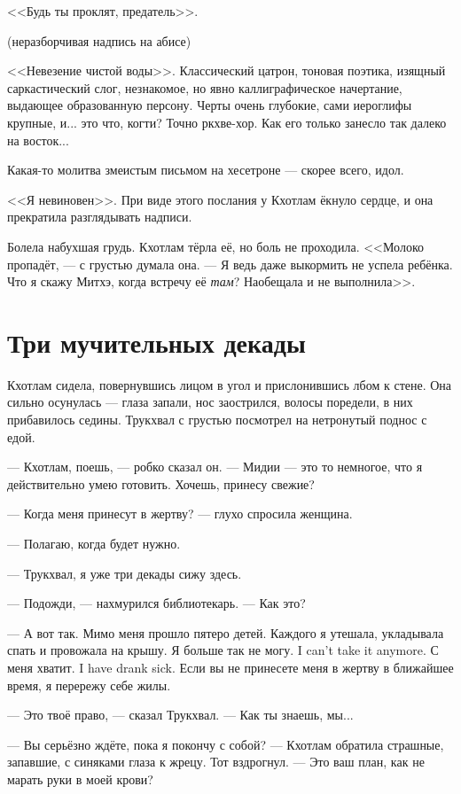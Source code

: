 <<Будь ты проклят, предатель>>.

(неразборчивая надпись на абисе)

<<Невезение чистой воды>>.
Классический цатрон, тоновая поэтика, изящный саркастический слог, незнакомое, но явно каллиграфическое начертание, выдающее образованную персону.
Черты очень глубокие, сами иероглифы крупные, и... это что, когти?
Точно ркхве-хор.
Как его только занесло так далеко на восток...

Какая-то молитва змеистым письмом на хесетроне --- скорее всего, идол.

<<Я невиновен>>.
При виде этого послания у Кхотлам ёкнуло сердце, и она прекратила разглядывать надписи.

Болела набухшая грудь.
Кхотлам тёрла её, но боль не проходила.
<<Молоко пропадёт, --- с грустью думала она.
--- Я ведь даже выкормить не успела ребёнка.
Что я скажу Митхэ, когда встречу её \emph{там}?
Наобещала и не выполнила>>.

\section{Три мучительных декады}

Кхотлам сидела, повернувшись лицом в угол и прислонившись лбом к стене.
Она сильно осунулась --- глаза запали, нос заострился, волосы поредели, в них прибавилось седины.
Трукхвал с грустью посмотрел на нетронутый поднос с едой.

--- Кхотлам, поешь, --- робко сказал он.
--- Мидии --- это то немногое, что я действительно умею готовить.
Хочешь, принесу свежие?

--- Когда меня принесут в жертву? --- глухо спросила женщина.

--- Полагаю, когда будет нужно.

--- Трукхвал, я уже три декады сижу здесь.

--- Подожди, --- нахмурился библиотекарь.
--- Как это?

--- А вот так.
Мимо меня прошло пятеро детей.
Каждого я утешала, укладывала спать и провожала на крышу.
{Я больше так не могу.}
{I can't take it anymore.}
{С меня хватит.}
{I have drank sick.}
Если вы не принесете меня в жертву в ближайшее время, я перережу себе жилы.

--- Это твоё право, --- сказал Трукхвал.
--- Как ты знаешь, мы...

--- Вы серьёзно ждёте, пока я покончу с собой? --- Кхотлам обратила страшные, запавшие, с синяками глаза к жрецу.
Тот вздрогнул.
--- Это ваш план, как не марать руки в моей крови?

